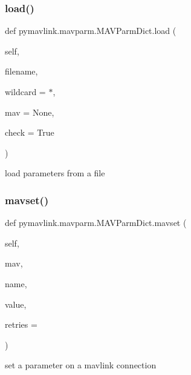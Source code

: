 \subsubsection{\texorpdfstring{load()}{load()}}
{\footnotesize\ttfamily def pymavlink.\+mavparm.\+M\+A\+V\+Parm\+Dict.\+load (\begin{DoxyParamCaption}\item[{}]{self,  }\item[{}]{filename,  }\item[{}]{wildcard = {\ttfamily \textquotesingle{}$\ast$\textquotesingle{}},  }\item[{}]{mav = {\ttfamily None},  }\item[{}]{check = {\ttfamily True} }\end{DoxyParamCaption})}

\begin{DoxyVerb}load parameters from a file\end{DoxyVerb}
 \mbox{\label{classpymavlink_1_1mavparm_1_1MAVParmDict_aa041ae6aca1eaf554e068912dfd56cae}} 
\subsubsection{\texorpdfstring{mavset()}{mavset()}}
{\footnotesize\ttfamily def pymavlink.\+mavparm.\+M\+A\+V\+Parm\+Dict.\+mavset (\begin{DoxyParamCaption}\item[{}]{self,  }\item[{}]{mav,  }\item[{}]{name,  }\item[{}]{value,  }\item[{}]{retries = {} }\end{DoxyParamCaption})}

\begin{DoxyVerb}set a parameter on a mavlink connection\end{DoxyVerb}
 \mbox{\label{classpymavlink_1_1mavparm_1_1MAVParmDict_a0f942689bbd320e3bf8201cb5b343ce0}} 
